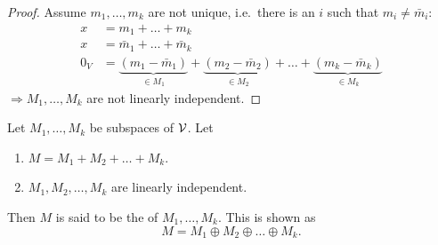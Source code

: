 \begin{proof}
Assume $m_1,\dots,m_k$ are not unique, i.e.\ there is an $i$ such that $m_i\ne\bar m_i$:
\begin{align*}
x&=m_1+\dots+m_k\\
x&=\bar m_1+\dots+\bar m_k\\
0_V&=\underbrace{(m_1-\bar m_1)}_{\in M_1}+\underbrace{(m_2-\bar m_2)}_{\in M_2}+\dots+\underbrace{(m_k-\bar m_k)}_{\in M_k}
\end{align*}
$\Rightarrow M_1,\dots,M_k$ are not linearly independent. \qedhere
\end{proof}

\begin{definition}
Let $M_1,\dots,M_k$ be subspaces of $\mathcal{V}$. Let
\begin{enumerate}[label=\roman*-)]
\item $M=M_1+M_2+\dots+M_k$.
\item $M_1,M_2,\dots,M_k$ are linearly independent.
\end{enumerate}
Then $M$ is said to be the  of $M_1,\dots,M_k$. This is shown as
\[
M=M_1\oplus M_2\oplus\dots\oplus M_k .
\]
\end{definition}

